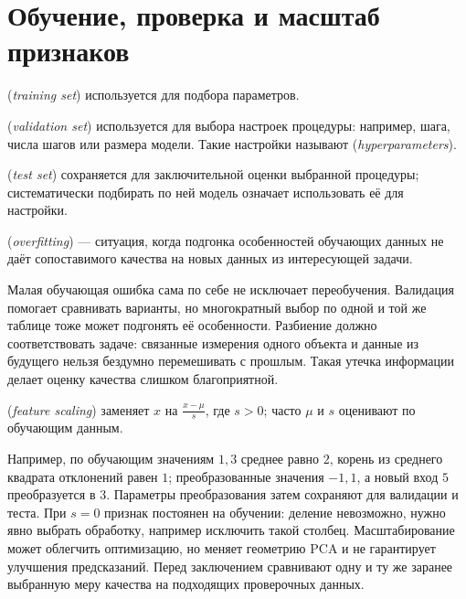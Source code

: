 \section{Обучение, проверка и масштаб признаков}
\begin{definition} (\emph{training set}) используется для подбора параметров.\end{definition}
\begin{definition} (\emph{validation set}) используется для выбора настроек процедуры: например, шага, числа шагов или размера модели. Такие настройки называют  (\emph{hyperparameters}).\end{definition}
\begin{definition} (\emph{test set}) сохраняется для заключительной оценки выбранной процедуры; систематически подбирать по ней модель означает использовать её для настройки.\end{definition}
\begin{definition} (\emph{overfitting}) --- ситуация, когда подгонка особенностей обучающих данных не даёт сопоставимого качества на новых данных из интересующей задачи.\end{definition}
Малая обучающая ошибка сама по себе не исключает переобучения. Валидация помогает сравнивать варианты, но многократный выбор по одной и той же таблице тоже может подгонять её особенности. Разбиение должно соответствовать задаче: связанные измерения одного объекта и данные из будущего нельзя бездумно перемешивать с прошлым. Такая утечка информации делает оценку качества слишком благоприятной.
\begin{definition} (\emph{feature scaling}) заменяет \(x\) на \(\frac{x-\mu}{s}\), где \(s>0\); часто \(\mu\) и \(s\) оценивают по обучающим данным.\end{definition}
Например, по обучающим значениям \(1,3\) среднее равно \(2\), корень из среднего квадрата отклонений равен \(1\); преобразованные значения \(-1,1\), а новый вход \(5\) преобразуется в \(3\). Параметры преобразования затем сохраняют для валидации и теста. При \(s=0\) признак постоянен на обучении: деление невозможно, нужно явно выбрать обработку, например исключить такой столбец. Масштабирование может облегчить оптимизацию, но меняет геометрию PCA и не гарантирует улучшения предсказаний. Перед заключением сравнивают одну и ту же заранее выбранную меру качества на подходящих проверочных данных.

